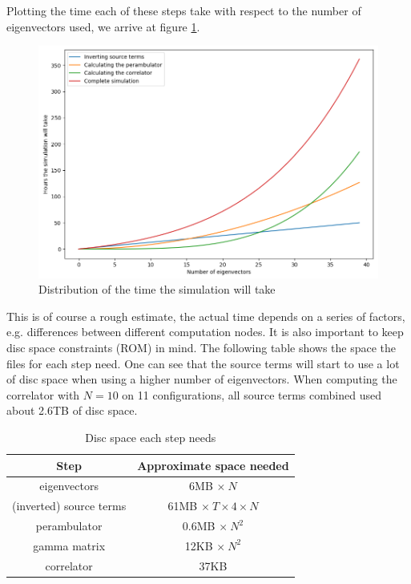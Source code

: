 Plotting the time each of these steps take with respect to the number of eigenvectors used, we arrive at figure \ref{time_of_sim}.

\begin{figure}[H]
        \centering
        \includegraphics[width=1\textwidth]{images/time_of_sim.png}
        \caption{Distribution of the time the simulation will take}
        \label{time_of_sim}
    \end{figure}

This is of course a rough estimate, the actual time depends on a series of factors, e.g. differences between different computation nodes. It is also important to keep disc space constraints (ROM) in mind. The following table shows the space the files for each step need. One can see that the source terms will start to use a lot of disc space when using a higher number of eigenvectors. When computing the correlator with $N = 10$ on 11 configurations, all source terms combined used about 2.6TB of disc space.

\begin{table}[h]
            \centering
            \begin{tabular}{|c|c|}
            \hline
            \multicolumn{1}{|c|}{Step} & \multicolumn{1}{c|}{Approximate space needed} \\ \hline
             eigenvectors & 6MB $\times\ N$\\
             (inverted) source terms & 61MB $\times\ T \times 4 \times N$\\
             perambulator & 0.6MB $\times\ N^2$\\
             gamma matrix & 12KB $\times\ N^2$\\
             correlator & 37KB\\
              \hline
            \end{tabular}
            \caption{Disc space each step needs}
            \label{disc_space}
        \end{table}

